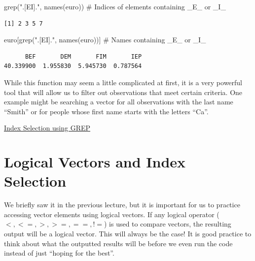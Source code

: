 \documentclass[
  letterpaper,
  DIV=11,
  numbers=noendperiod]{scrreprt}
\newenvironment{Shaded}{\begin{snugshade}}{\end{snugshade}}
\newcommand{\CommentTok}[1]{\textcolor[rgb]{0.37,0.37,0.37}{#1}}
\newcommand{\FunctionTok}[1]{\textcolor[rgb]{0.28,0.35,0.67}{#1}}
\newcommand{\NormalTok}[1]{\textcolor[rgb]{0.00,0.23,0.31}{#1}}
\newcommand{\StringTok}[1]{\textcolor[rgb]{0.13,0.47,0.30}{#1}}
\begin{document}
\begin{Shaded}
\begin{Highlighting}[]
\FunctionTok{grep}\NormalTok{(}\StringTok{".[EI]."}\NormalTok{, }\FunctionTok{names}\NormalTok{(euro)) }\CommentTok{\# Indices of elements containing \_E\_ or \_I\_}
\end{Highlighting}
\end{Shaded}

\begin{verbatim}
[1] 2 3 5 7
\end{verbatim}

\begin{Shaded}
\begin{Highlighting}[]
\NormalTok{euro[}\FunctionTok{grep}\NormalTok{(}\StringTok{".[EI]."}\NormalTok{, }\FunctionTok{names}\NormalTok{(euro))] }\CommentTok{\# Names containing \_E\_ or \_I\_}
\end{Highlighting}
\end{Shaded}

\begin{verbatim}
      BEF       DEM       FIM       IEP 
40.339900  1.955830  5.945730  0.787564 
\end{verbatim}

While this function may seem a little complicated at first, it is a very
powerful tool that will allow us to filter out observations that meet
certain criteria. One example might be searching a vector for all
observations with the last name ``Smith'' or for people whose first name
starts with the letters ``Ca''.

\begin{watch}{}{}
    \href{https://youtu.be/BDRppgPi8-E}{Index Selection using GREP}
\end{watch}

\section{Logical Vectors and Index
Selection}\label{logical-vectors-and-index-selection}

We briefly saw it in the previous lecture, but it is important for us to
practice accessing vector elements using logical vectors. If any logical
operator (\(<,<=, >, >=, ==, !=\)) is used to compare vectors, the
resulting output will be a logical vector. This will always be the case!
It is good practice to think about what the outputted results will be
before we even run the code instead of just ``hoping for the best''.
\end{document}
